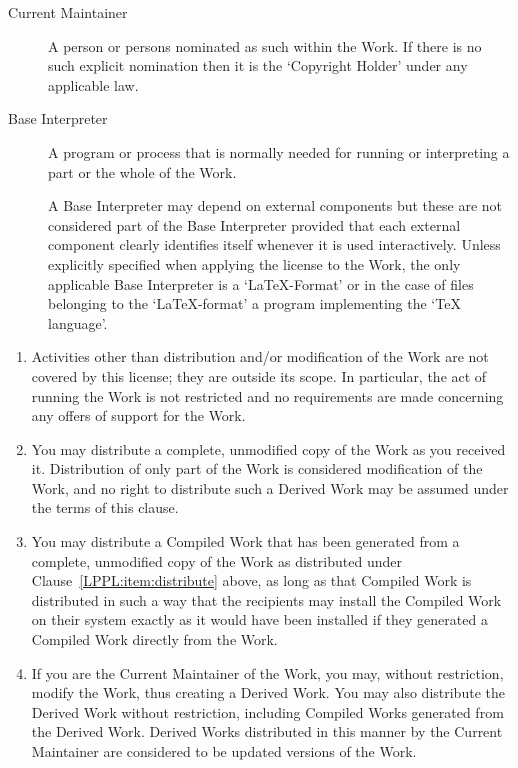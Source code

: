 \begin{LPPLicense}
\begin{description}
  \item[Current Maintainer] A person or persons nominated as such
    within the Work.  If there is no such explicit nomination then it
    is the `Copyright Holder' under any applicable law.

  \item[Base Interpreter] A program or process that is normally needed
    for running or interpreting a part or the whole of the Work.
    
    A Base Interpreter may depend on external components but these are
    not considered part of the Base Interpreter provided that each
    external component clearly identifies itself whenever it is used
    interactively.  Unless explicitly specified when applying the
    license to the Work, the only applicable Base Interpreter is a
    `\LaTeX-Format' or in the case of files belonging to the
    `\LaTeX-format' a program implementing the `\TeX{} language'.
  \end{description}

  \label{LPPL:Conditions}

  \begin{enumerate}
  \item Activities other than distribution and/or modification of the
    Work are not covered by this license; they are outside its scope.
    In particular, the act of running the Work is not restricted and
    no requirements are made concerning any offers of support for the
    Work.

  \item\label{LPPL:item:distribute} You may distribute a complete, unmodified
    copy of the Work as you received it.  Distribution of only part of
    the Work is considered modification of the Work, and no right to
    distribute such a Derived Work may be assumed under the terms of
    this clause.

  \item You may distribute a Compiled Work that has been generated
    from a complete, unmodified copy of the Work as distributed under
    Clause~\ref{LPPL:item:distribute} above, as long as that Compiled Work is
    distributed in such a way that the recipients may install the
    Compiled Work on their system exactly as it would have been
    installed if they generated a Compiled Work directly from the
    Work.

  \item\label{LPPL:item:currmaint} If you are the Current Maintainer of the
    Work, you may, without restriction, modify the Work, thus creating
    a Derived Work.  You may also distribute the Derived Work without
    restriction, including Compiled Works generated from the Derived
    Work.  Derived Works distributed in this manner by the Current
    Maintainer are considered to be updated versions of the Work.


\end{enumerate}
\end{LPPLicense}
